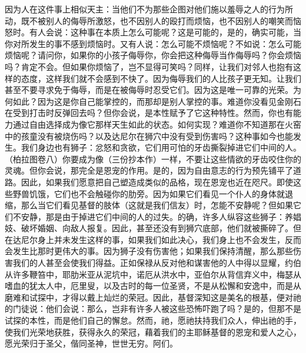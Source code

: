 因为人在这件事上相似天主：当他们不为那些企图对他们施以羞辱之人的行为所动，既不被别人的侮辱所激怒，也不因别人的殴打而烦恼，也不因别人的嘲笑而恼怒时。有人会说：这种事在本质上怎么可能呢？这是可能的，是的，确实可能，当你对所发生的事不感到烦恼时。又有人说：怎么可能不烦恼呢？不如说：怎么可能烦恼呢？请问你，如果你的小孩子侮辱你，你会把这种侮辱当作侮辱吗？你会烦恼吗？肯定不会。但如果你烦恼了，岂不显得可笑吗？同样，让我们对邻人也抱有这样的态度，这样我们就不会感到不快了。因为侮辱我们的人比孩子更无知。让我们甚至不要寻求免于侮辱，而是在被侮辱时忍受它们。因为这是唯一可靠的光荣。为何如此？因为这是你自己能掌控的，而那却是别人掌控的事。难道你没看见金刚石在受到打击时反弹回去吗？但你会说，是本性赋予了它这种特性。然而，你也有能力通过自由选择成为像它那样天生如此的状态。如何实现？难道你不知道那在火窑中的孩童没有被烧伤吗？以及达尼尔在狮穴中没有受到伤害吗？这种事如今也能发生。我们身边也有狮子：忿怒和贪欲，它们用可怕的牙齿撕裂掉进它们中间的人。（柏拉图卷八）你要成为像（三份抄本作）一样，不要让这些情欲的牙齿咬住你的灵魂。但你会说，那完全是恩宠的作用。是的，因为自由意志的行为预先铺平了道路。因此，如果我们愿意把自己塑造成类似的品格，现在恩宠也近在咫尺。即使这些野兽饥饿，它们也不会触碰你的肋旁。因为如果它们看见一个仆人的身体就退缩，那么当它们看见基督的肢体（这就是我们信友）时，怎能不安静呢？但如果它们不安静，那是由于掉进它们中间的人的过失。的确，许多人纵容这些狮子：养娼妓、破坏婚姻、向敌人报复。因此，甚至还没有到狮穴底部，他们就被撕碎了。但在达尼尔身上并未发生这样的事，如果我们如此决心，我们身上也不会发生，反而会发生比那时更伟大的事。因为狮子没有伤害他；如果我们保持清醒，那么那些伤害我们的人甚至会使我们得益。正如保禄从反对他和谋害他的人中得以显耀，约伯从许多鞭笞中，耶肋米亚从泥坑中，诺厄从洪水中，亚伯尔从背信弃义中，梅瑟从嗜血的犹太人中，厄里叟，以及古时的每一位圣贤，不是从松懈和安逸中，而是从磨难和试探中，才得以戴上灿烂的荣冠。因此，基督深知这是美名的根基，便对祂的门徒说：他们会说：那么，岂非有许多人被这些恐怖吓跑了吗？是的，但那不是试探的本性，而是他们自己的懈怠。然而，祂，愿祂扶持我们众人，伸出祂的手，使我们光荣地获胜，获得永久的荣冠，藉着我们的主耶稣基督的恩宠和爱人之心，愿光荣归于圣父，偕同圣神，世世无穷。阿们。\par


